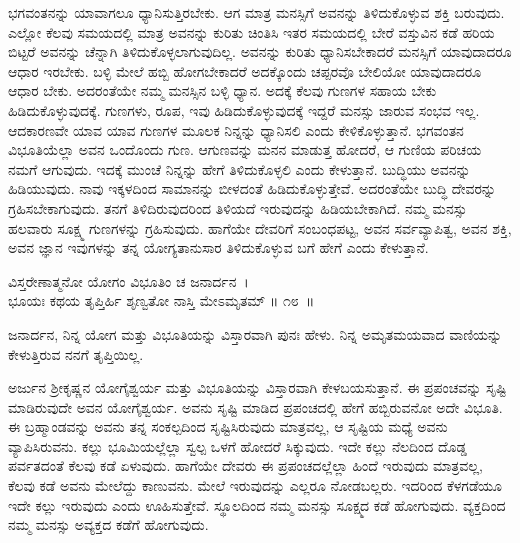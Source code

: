 ಭಗವಂತನನ್ನು ಯಾವಾಗಲೂ ಧ್ಯಾನಿಸುತ್ತಿರಬೇಕು. ಆಗ ಮಾತ್ರ ಮನಸ್ಸಿಗೆ ಅವನನ್ನು ತಿಳಿದುಕೊಳ್ಳುವ ಶಕ್ತಿ ಬರುವುದು. ಎಲ್ಲೋ ಕೆಲವು ಸಮಯದಲ್ಲಿ ಮಾತ್ರ ಅವನನ್ನು ಕುರಿತು ಚಿಂತಿಸಿ ಇತರ ಸಮಯದಲ್ಲಿ ಬೇರೆ ವಸ್ತುವಿನ ಕಡೆ ಹರಿಯ ಬಿಟ್ಟರೆ ಅವನನ್ನು ಚೆನ್ನಾಗಿ ತಿಳಿದುಕೊಳ್ಳಲಾಗುವುದಿಲ್ಲ. ಅವನನ್ನು ಕುರಿತು ಧ್ಯಾನಿಸಬೇಕಾದರೆ ಮನಸ್ಸಿಗೆ ಯಾವುದಾದರೂ ಆಧಾರ ಇರಬೇಕು. ಬಳ್ಳಿ ಮೇಲೆ ಹಬ್ಬಿ ಹೋಗಬೇಕಾದರೆ ಅದಕ್ಕೊಂದು ಚಪ್ಪರವೊ ಬೇಲಿಯೋ ಯಾವುದಾದರೂ ಆಧಾರ ಬೇಕು. ಅದರಂತೆಯೇ ನಮ್ಮ ಮನಸ್ಸಿನ ಬಳ್ಳಿ ಧ್ಯಾನ. ಅದಕ್ಕೆ ಕೆಲವು ಗುಣಗಳ ಸಹಾಯ ಬೇಕು ಹಿಡಿದುಕೊಳ್ಳುವುದಕ್ಕೆ. ಗುಣಗಳು, ರೂಪ, ಇವು ಹಿಡಿದುಕೊಳ್ಳುವುದಕ್ಕೆ ಇದ್ದರೆ ಮನಸ್ಸು ಜಾರುವ ಸಂಭವ ಇಲ್ಲ. ಆದಕಾರಣವೇ ಯಾವ ಯಾವ ಗುಣಗಳ ಮೂಲಕ ನಿನ್ನನ್ನು ಧ್ಯಾನಿಸಲಿ ಎಂದು ಕೇಳಿಕೊಳ್ಳುತ್ತಾನೆ. ಭಗವಂತನ ವಿಭೂತಿಯೆಲ್ಲಾ ಅವನ ಒಂದೊಂದು ಗುಣ. ಆ\break ಗುಣವನ್ನು ಮನನ ಮಾಡುತ್ತ ಹೋದರೆ, ಆ ಗುಣಿಯ ಪರಿಚಯ ನಮಗೆ ಆಗುವುದು. ಇದಕ್ಕೆ ಮುಂಚೆ ನಿನ್ನನ್ನು ಹೇಗೆ ತಿಳಿದುಕೊಳ್ಳಲಿ ಎಂದು ಕೇಳುತ್ತಾನೆ. ಬುದ್ಧಿಯು ಅವನನ್ನು ಹಿಡಿಯುವುದು. ನಾವು ಇಕ್ಕಳದಿಂದ ಸಾಮಾನನ್ನು ಬೀಳದಂತೆ ಹಿಡಿದುಕೊಳ್ಳುತ್ತೇವೆ. ಅದರಂತೆಯೇ ಬುದ್ಧಿ ದೇವರನ್ನು ಗ್ರಹಿಸಬೇಕಾಗುವುದು. ತನಗೆ ತಿಳಿದಿರುವುದರಿಂದ ತಿಳಿಯದೆ ಇರುವುದನ್ನು ಹಿಡಿಯಬೇಕಾಗಿದೆ. ನಮ್ಮ ಮನಸ್ಸು ಹಲವಾರು ಸೂಕ್ಷ್ಮ ಗುಣಗಳನ್ನು ಗ್ರಹಿಸುವುದು. ಹಾಗೆಯೇ ದೇವರಿಗೆ ಸಂಬಂಧಪಟ್ಟ, ಅವನ ಸರ್ವವ್ಯಾಪಿತ್ವ, ಅವನ ಶಕ್ತಿ, ಅವನ ಜ್ಞಾನ ಇವುಗಳನ್ನು ತನ್ನ ಯೋಗ್ಯತಾನುಸಾರ ತಿಳಿದುಕೊಳ್ಳುವ ಬಗೆ ಹೇಗೆ ಎಂದು ಕೇಳುತ್ತಾನೆ.

\begin{shloka}
ವಿಸ್ತರೇಣಾತ್ಮನೋ ಯೋಗಂ ವಿಭೂತಿಂ ಚ ಜನಾರ್ದನ~।\\ಭೂಯಃ ಕಥಯ ತೃಪ್ತಿರ್ಹಿ ಶೃಣ್ವತೋ ನಾಸ್ತಿ ಮೇಽಮೃತಮ್ \hfill॥ ೧೮~॥
\end{shloka}

\begin{artha}
ಜನಾರ್ದನ, ನಿನ್ನ ಯೋಗ ಮತ್ತು ವಿಭೂತಿಯನ್ನು ವಿಸ್ತಾರವಾಗಿ ಪುನಃ ಹೇಳು. ನಿನ್ನ ಅಮೃತಮಯವಾದ ವಾಣಿಯನ್ನು ಕೇಳುತ್ತಿರುವ ನನಗೆ ತೃಪ್ತಿಯಿಲ್ಲ.
\end{artha}

ಅರ್ಜುನ ಶ‍್ರೀಕೃಷ್ಣನ ಯೋಗೈಶ್ವರ್ಯ ಮತ್ತು ವಿಭೂತಿಯನ್ನು ವಿಸ್ತಾರವಾಗಿ ಕೇಳಬಯಸುತ್ತಾನೆ. ಈ ಪ್ರಪಂಚವನ್ನು ಸೃಷ್ಟಿ ಮಾಡಿರುವುದೇ ಅವನ ಯೋಗೈಶ್ವರ್ಯ. ಅವನು ಸೃಷ್ಟಿ ಮಾಡಿದ ಪ್ರಪಂಚದಲ್ಲಿ ಹೇಗೆ ಹಬ್ಬಿರುವನೋ ಅದೇ ವಿಭೂತಿ. ಈ ಬ್ರಹ್ಮಾಂಡವನ್ನು ಅವನು ತನ್ನ ಸಂಕಲ್ಪದಿಂದ ಸೃಷ್ಟಿಸಿರುವುದು ಮಾತ್ರವಲ್ಲ, ಆ ಸೃಷ್ಟಿಯ ಮಧ್ಯೆ ಅವನು ವ್ಯಾಪಿಸಿರುವನು. ಕಲ್ಲು ಭೂಮಿಯಲ್ಲೆಲ್ಲಾ ಸ್ವಲ್ಪ ಒಳಗೆ ಹೋದರೆ ಸಿಕ್ಕುವುದು. ಇದೇ ಕಲ್ಲು ನೆಲದಿಂದ ದೊಡ್ಡ ಪರ್ವತದಂತೆ ಕೆಲವು ಕಡೆ ಏಳುವುದು. ಹಾಗೆಯೇ ದೇವರು ಈ ಪ್ರಪಂಚದಲ್ಲೆಲ್ಲಾ ಹಿಂದೆ ಇರುವುದು ಮಾತ್ರವಲ್ಲ, ಕೆಲವು ಕಡೆ ಅವನು ಮೇಲೆದ್ದು ಕಾಣುವನು. ಮೇಲೆ ಇರುವುದನ್ನು ಎಲ್ಲರೂ ನೋಡಬಲ್ಲರು. ಇದರಿಂದ ಕೆಳಗಡೆಯೂ ಇದೇ ಕಲ್ಲು ಇರುವುದು ಎಂದು ಊಹಿಸುತ್ತೇವೆ. ಸ್ಥೂಲದಿಂದ ನಮ್ಮ ಮನಸ್ಸು ಸೂಕ್ಷ್ಮದ ಕಡೆ ಹೋಗುವುದು. ವ್ಯಕ್ತದಿಂದ ನಮ್ಮ ಮನಸ್ಸು ಅವ್ಯಕ್ತದ ಕಡೆಗೆ ಹೋಗುವುದು.

